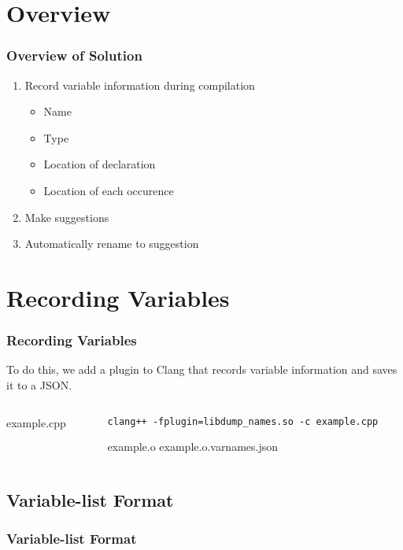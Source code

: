 \documentclass[12pt]{beamer}
\begin{document}
\section{Overview}
\begin{frame}
	\frametitle{Overview of Solution}
	\begin{enumerate}
		\item Record variable information during compilation
		\begin{itemize}
			\item Name
			\item Type
			\item Location of declaration
			\item Location of each occurence
		\end{itemize}
		\item Make suggestions
		\item Automatically rename to suggestion
	\end{enumerate}
\end{frame}
\section{Recording Variables}
\begin{frame}
	\frametitle{Recording Variables}
	To do this, we add a plugin to Clang that records variable information and
	saves it to a JSON.
	\begin{columns}
		\begin{column}{0.50\textwidth}
			
					{example.cpp}
		\end{column}
		\begin{column}{0.35\textwidth}
			\lstset{breaklines=true}
			\lstinline|clang++ -fplugin=libdump_names.so -c example.cpp|
			\lstset{breaklines=false}

			\textrightarrow example.o
			\textrightarrow example.o.varnames.json
		\end{column}
	\end{columns}
\end{frame}
\subsection{Variable-list Format}
\begin{frame}
	\frametitle{Variable-list Format}
	
\end{frame}
\end{document}
